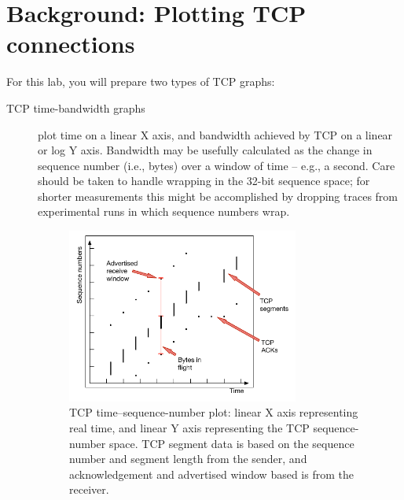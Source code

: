 \documentclass[a4paper,10pt]{article}
\begin{document}
\section*{Background: Plotting TCP connections}

For this lab, you will prepare two types of TCP graphs:

\begin{description}
\item[TCP time-bandwidth graphs] plot time on a linear X axis, and bandwidth
  achieved by TCP on a linear or log Y axis.
  Bandwidth may be usefully calculated as the change in sequence number (i.e.,
  bytes) over a window of time -- e.g., a second.
  Care should be taken to handle wrapping in the 32-bit sequence space; for
  shorter measurements this might be accomplished by dropping traces from
  experimental runs in which sequence numbers wrap.

\begin{figure}[t]
\begin{center}
  \includegraphics[width=0.75\textwidth]{tcp-time-sequence.pdf}
\end{center}
\caption{TCP time--sequence-number plot: linear X axis representing real time,
and linear Y axis representing the TCP sequence-number space.
TCP segment data is based on the sequence number and segment length from the
sender, and acknowledgement and advertised window based is from the receiver.}
\label{fig:tcp-time-sequence-number-graph}
\end{figure}


\end{description}
\end{document}
